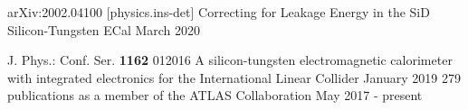 
\begin{cventries}
\cventry
  {arXiv:2002.04100 [physics.ins-det]}
  {Correcting for Leakage Energy in the SiD Silicon-Tungsten ECal}
  {March 2020}
  {}
  {}

\vspace{-0.4cm}  \cventry
  {J. Phys.: Conf. Ser. \textbf{1162} 012016}
  {A silicon-tungsten electromagnetic calorimeter with integrated electronics for the International Linear Collider}
  {January 2019}
  {}
  {}  
 \vspace{-0.4cm}\cventry
 {}
 {279 publications as a member of the ATLAS Collaboration}
 {May 2017 - present}
 {}
 {}
\end{cventries}  


